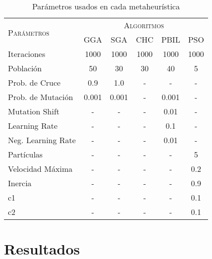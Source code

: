 \begin{table}[h!]
\centering
\begin{tabular}{l c c c c c}
\hline
\multirow{2}{*}{\textsc{Parámetros}}
	& \multicolumn{5}{c}{\textsc{Algoritmos}} \\\cline{2-6}
	& GGA & SGA & CHC & PBIL & PSO \\
\hline
\hline
Iteraciones        &  1000 &  1000 &  1000 &  1000 &  1000 \\
Población          &    50 &    30 &    30 &    40 &     5 \\
Prob. de Cruce     &   0.9 &   1.0 &     - &     - &     - \\
Prob. de Mutación  & 0.001 & 0.001 &     - & 0.001 &     - \\
Mutation Shift     &     - &     - &     - &  0.01 &     - \\
Learning Rate      &     - &     - &     - &   0.1 &     - \\
Neg. Learning Rate &     - &     - &     - &  0.01 &     - \\
Partículas         &     - &     - &     - &     - &     5 \\
Velocidad Máxima   &     - &     - &     - &     - &   0.2 \\
Inercia            &     - &     - &     - &     - &   0.9 \\
c1                 &     - &     - &     - &     - &   0.1 \\
c2                 &     - &     - &     - &     - &   0.1 \\
\hline
\end{tabular}
\caption{Parámetros usados en cada metaheurística}
\label{table-parameters}
\end{table}

\section{Resultados}

\blindtext
